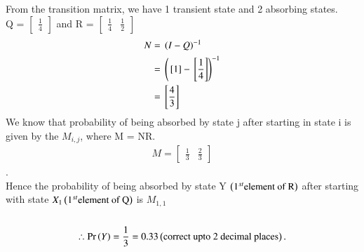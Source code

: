 From the transition matrix, we have 1 transient state and 2 absorbing states.\\ Q = $\begin{bmatrix} \frac{1}{4} \end{bmatrix}$ and R = $\begin{bmatrix} \frac{1}{4} & \frac{1}{2} \end{bmatrix}$
\begin{align}
 N ={}& \left(I - Q\right)^{-1}\\
 ={}& \left({}\left[1\right] - {}\left[\frac{1}{4}\right]\right)^{-1}\\
 ={}& {}\left[\frac{4}{3}\right]
\end{align}
We know that probability of being absorbed by state j after starting in state i is given by the $M_{i,j}$, where M = NR.\\
\begin{align}
M = \begin{bmatrix} \frac{1}{3} & \frac{2}{3} \end{bmatrix}
\end{align}.\\
 Hence the probability of being absorbed by state Y $\left(1^{st} \text{element of R}\right)$ after starting with state $X_{1}\left(1^{st}\text{element of Q}\right)$ is $M_{1,1}$\\
 \\
\begin{align}
\therefore \Pr\left(Y\right)=\frac{1}{3}=0.33 \left(\text{correct upto 2 decimal places}\right).
\end{align}
